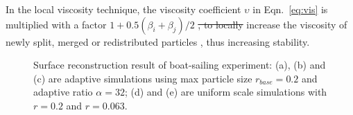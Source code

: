 \documentclass[VANCOUVER,STIX1COL]{WileyNJD-v2}
\providecommand{\DIFadd}[1]{{\protect\color{blue}\uwave{#1}}} %
\providecommand{\DIFdel}[1]{{\protect\color{red}\sout{#1}}}                      %
\providecommand{\DIFaddbegin}{} %
\providecommand{\DIFaddend}{} %
\providecommand{\DIFdelbegin}{} %
\providecommand{\DIFdelend}{} %
\providecommand{\DIFaddFL}[1]{\DIFadd{#1}} %
\providecommand{\DIFaddbeginFL}{} %
\providecommand{\DIFaddendFL}{} %
\begin{document}
In the local viscosity technique, the viscosity coefficient $\upsilon$ in Eqn.~\ref{eq:vis} is multiplied with a factor $1 + 0.5(\beta_i + \beta_j)/2$ \DIFdelbegin \DIFdel{, to locally }\DIFdelend \DIFaddbegin \DIFadd{to }\DIFaddend increase the viscosity of newly split, merged or redistributed particles \DIFaddbegin \DIFadd{locally}\DIFaddend , thus increasing stability.

\begin{figure}
    \centering
    \caption{Surface reconstruction result of \DIFaddbeginFL \DIFaddFL{the }\DIFaddendFL boat-sailing experiment: (a), (b) and (c) are adaptive simulations using max particle size $r_{base} = 0.2$ and adaptive ratio $\alpha = 32$; (d) and (e) are uniform scale simulations with $r = 0.2$ and $r = 0.063$.}
    \label{fig:ship_reconstruct}
\end{figure}
\end{document}
